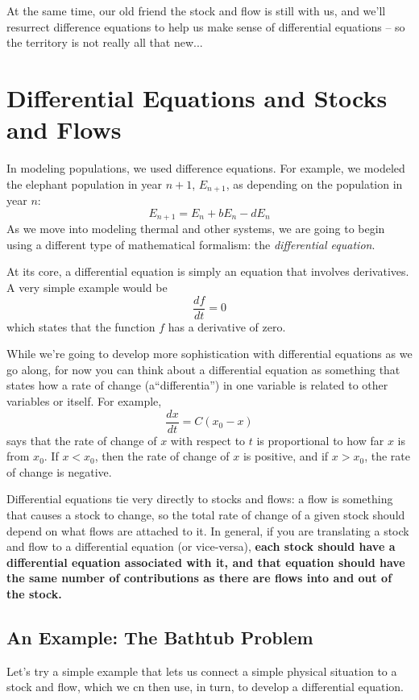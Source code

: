 At the same time, our old friend the stock and flow is still with us, and we'll resurrect difference equations to help us make sense of differential equations -- so the territory is not really all that new...

\section{Differential Equations and Stocks and Flows}

In modeling populations, we used difference equations.  For example, we modeled the elephant population in year $n+1$, $E_{n+1}$, as depending on the population in year $n$:
$$E_{n+1} = E_n + bE_n - d E_n$$
As we move into modeling thermal and other systems, we are going to begin using a different type of mathematical formalism:  the {\it differential equation}.

At its core, a differential equation is simply an equation that involves derivatives.  A very simple example would be
$$\frac{df}{dt} = 0$$
which states that the function $f$ has a derivative of zero.

While we're going to develop more sophistication with differential equations as we go along, for now you can think about a differential equation as something that states how a rate of change (a``differentia'') in one variable is related to other variables or itself.  For example, 
$$\frac{dx}{dt} = C(x_0-x)$$
says that the rate of change of  $x$ with respect to $t$ is proportional to how far $x$ is from $x_0$.  If $x<x_0$, then the rate of change of $x$ is positive, and if $x>x_0$, the rate of change is negative.  

Differential equations tie very directly to stocks and flows:  a flow is something that causes a stock to change, so the total rate of change of a given stock should depend on what flows are attached to it.  In general, if you are translating a stock and flow to a differential equation (or vice-versa), 
{\bf each stock should have a differential equation associated with it, and that equation should have the same number of contributions as there are flows into and out of the stock.}   

\subsection{An Example: The Bathtub Problem}

Let's try a simple example that lets us connect a simple physical situation to a stock and flow, which we cn then use, in turn, to develop a differential equation.

